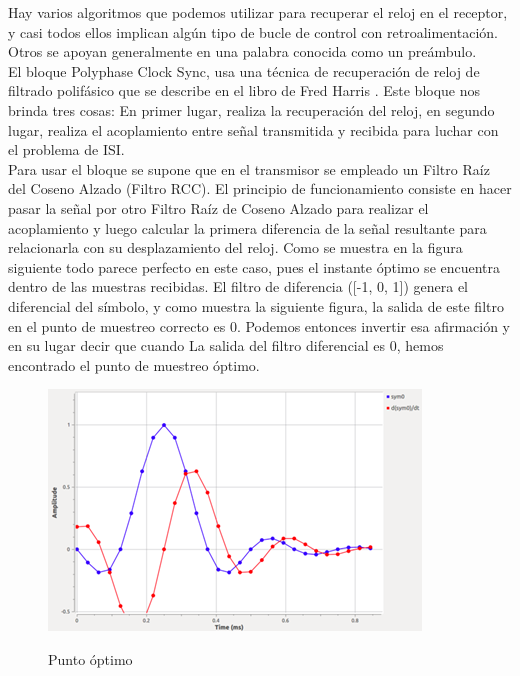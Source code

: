 Hay varios algoritmos que podemos utilizar para recuperar el reloj en el receptor, y casi todos ellos implican algún tipo de bucle de control con retroalimentación. Otros se apoyan generalmente en una palabra conocida como un preámbulo. \\

El bloque Polyphase Clock Sync, usa una técnica de recuperación de reloj de filtrado polifásico que se describe en el libro de Fred Harris . Este bloque nos brinda tres cosas: En primer lugar, realiza la recuperación del reloj, en segundo lugar, realiza el acoplamiento entre señal transmitida y recibida para luchar con el problema de ISI. \\

Para usar el bloque se supone que en el transmisor se empleado un Filtro Raíz del Coseno Alzado (Filtro RCC). El principio de funcionamiento consiste en hacer pasar la señal por otro Filtro Raíz de Coseno Alzado para realizar el acoplamiento y luego calcular la primera diferencia de la señal resultante para relacionarla con su desplazamiento del reloj. Como se muestra en la figura siguiente todo parece perfecto en este caso, pues el instante óptimo se encuentra dentro de las muestras recibidas. El filtro de diferencia ([-1, 0, 1]) genera el diferencial del símbolo, y como muestra la siguiente figura, la salida de este filtro en el punto de muestreo correcto es 0. Podemos entonces invertir esa afirmación y en su lugar decir que cuando La salida del filtro diferencial es 0, hemos encontrado el punto de muestreo óptimo. \\

\begin{figure}[h!]
	\captionsetup{justification = raggedright, singlelinecheck = false}
	\caption{Punto óptimo} 
	\centering
	\includegraphics[scale=1.2]{Imagenes/Punto-optimo.png}
	\label{fig:Punto-optimo}
\end{figure}


